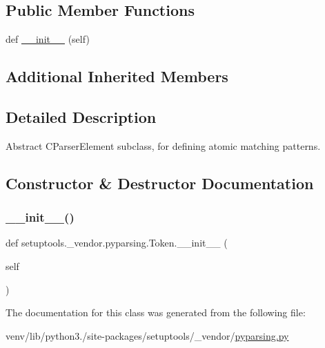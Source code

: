 \subsection*{Public Member Functions}
\begin{DoxyCompactItemize}
\item 
def \hyperlink{classsetuptools_1_1__vendor_1_1pyparsing_1_1Token_a862cef4540962af281f5af5775fc07bd}{\+\_\+\+\_\+init\+\_\+\+\_\+} (self)
\end{DoxyCompactItemize}
\subsection*{Additional Inherited Members}


\subsection{Detailed Description}
\begin{DoxyVerb}Abstract C{ParserElement} subclass, for defining atomic matching patterns.
\end{DoxyVerb}
 

\subsection{Constructor \& Destructor Documentation}
\mbox{\label{classsetuptools_1_1__vendor_1_1pyparsing_1_1Token_a862cef4540962af281f5af5775fc07bd}} 
\subsubsection{\texorpdfstring{\+\_\+\+\_\+init\+\_\+\+\_\+()}{\_\_init\_\_()}}
{\footnotesize\ttfamily def setuptools.\+\_\+vendor.\+pyparsing.\+Token.\+\_\+\+\_\+init\+\_\+\+\_\+ (\begin{DoxyParamCaption}\item[{}]{self }\end{DoxyParamCaption})}



The documentation for this class was generated from the following file\+:\begin{DoxyCompactItemize}
\item 
venv/lib/python3./site-\/packages/setuptools/\+\_\+vendor/\hyperlink{setuptools_2__vendor_2pyparsing_8py}{pyparsing.\+py}\end{DoxyCompactItemize}
